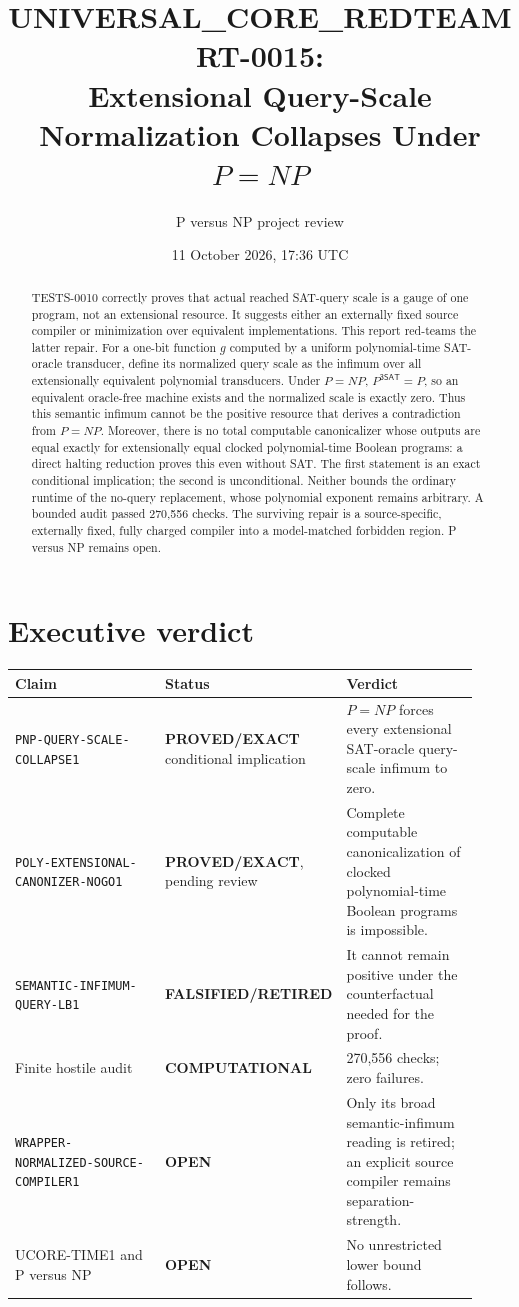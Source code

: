 \documentclass[11pt]{article}
\title{UNIVERSAL\_CORE\_REDTEAM RT-0015:\\
Extensional Query-Scale Normalization Collapses Under $P=NP$}
\author{P versus NP project review}
\date{11 October 2026, 17:36 UTC}
\newcommand{\SAT}{\mathsf{3SAT}}
\newcommand{\EXACT}{\textbf{PROVED/EXACT}}
\newcommand{\OPEN}{\textbf{OPEN}}
\newcommand{\RETIRED}{\textbf{FALSIFIED/RETIRED}}
\newcommand{\COMP}{\textbf{COMPUTATIONAL}}
\begin{document}
\maketitle

\begin{abstract}
TESTS-0010 correctly proves that actual reached SAT-query scale is a gauge of
one program, not an extensional resource.  It suggests either an externally
fixed source compiler or minimization over equivalent implementations.  This
report red-teams the latter repair.  For a one-bit function $g$ computed by a
uniform polynomial-time SAT-oracle transducer, define its normalized query
scale as the infimum over all extensionally equivalent polynomial
transducers.  Under $P=NP$, $P^{\SAT}=P$, so an equivalent oracle-free
machine exists and the normalized scale is exactly zero.  Thus this semantic
infimum cannot be the positive resource that derives a contradiction from
$P=NP$.  Moreover, there is no total computable canonicalizer whose outputs
are equal exactly for extensionally equal clocked polynomial-time Boolean
programs: a direct halting reduction proves this even without SAT.  The first
statement is an exact conditional implication; the second is unconditional.
Neither bounds the ordinary runtime of the no-query replacement, whose
polynomial exponent remains arbitrary.  A bounded audit passed 270,556
checks.  The surviving repair is a source-specific, externally fixed,
fully charged compiler into a model-matched forbidden region.  P versus NP
remains open.
\end{abstract}

\section{Executive verdict}

\begin{center}\small
\begin{tabular}{@{}p{0.41\linewidth}p{0.19\linewidth}p{0.32\linewidth}@{}}
\toprule
Claim & Status & Verdict\\ \midrule
\texttt{PNP-QUERY-SCALE-COLLAPSE1} & \EXACT{} conditional implication &
$P=NP$ forces every extensional SAT-oracle query-scale infimum to zero.\\
\texttt{POLY-EXTENSIONAL-CANONIZER-NOGO1} & \EXACT, pending review &
Complete computable canonicalization of clocked polynomial-time Boolean
programs is impossible.\\
\texttt{SEMANTIC-INFIMUM-QUERY-LB1} & \RETIRED &
It cannot remain positive under the counterfactual needed for the proof.\\
Finite hostile audit & \COMP & 270,556 checks; zero failures.\\
\texttt{WRAPPER-NORMALIZED-SOURCE-COMPILER1} & \OPEN &
Only its broad semantic-infimum reading is retired; an explicit source
compiler remains separation-strength.\\
UCORE-TIME1 and P versus NP & \OPEN & No unrestricted lower bound follows.\\
\bottomrule
\end{tabular}
\end{center}
\end{document}
